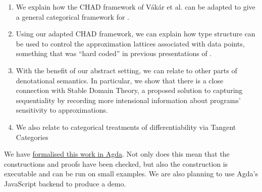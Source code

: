 \begin{enumerate}
\item We explain how the CHAD framework of Vákár et al. can be adapted to give a general categorical framework for \GPS.
\item Using our adapted CHAD framework, we can explain how type structure can be used to control the approximation lattices associated with data points, something that was ``hard coded'' in previous presentations of \GPS.
\item With the benefit of our abstract setting, we can relate \GPS to other parts of denotational semantics. In particular, we show that there is a close connection with Stable Domain Theory, a proposed solution to capturing sequentiality by recording more intensional information about programs' sensitivity to approximations.
\item We also relate \GPS to categorical treatments of differentiability via Tangent Categories 
\end{enumerate}

We have \href{https://github.com/bobatkey/approx-diff}{formalised this work in Agda}. Not only does this mean that the constructions and proofs have been checked, but also the construction is executable and can be run on small examples. We are also planning to use Agda's JavaScript backend to produce a demo. 
